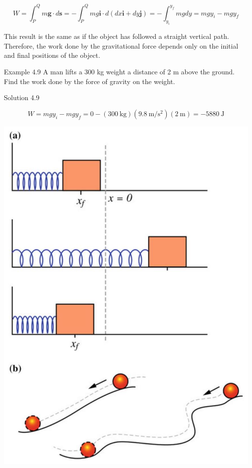 \documentclass[10pt]{article}
\begin{document}
$$
W=\int_{P}^{Q} m \mathbf{g} \cdot d \mathbf{s}=-\int_{P}^{Q} m g \mathbf{i} \cdot d(d x \mathbf{i}+d y \mathbf{j})=-\int_{y_{i}}^{y_{f}} m g d y=m g y_{i}-m g y_{f}
$$

This result is the same as if the object has followed a straight vertical path. Therefore, the work done by the gravitational force depends only on the initial and final positions of the object.

Example 4.9 A man lifts a 300 kg weight a distance of 2 m above the ground. Find the work done by the force of gravity on the weight.

Solution 4.9

$$
W=m g y_{i}-m g y_{f}=0-(300 \mathrm{~kg})\left(9.8 \mathrm{~m} / \mathrm{s}^{2}\right)(2 \mathrm{~m})=-5880 \mathrm{~J}
$$

\begin{center}
\includegraphics[max width=\textwidth]{2024_09_13_db1f357d2aad0a03eb2eg-068}
\end{center}
\end{document}
